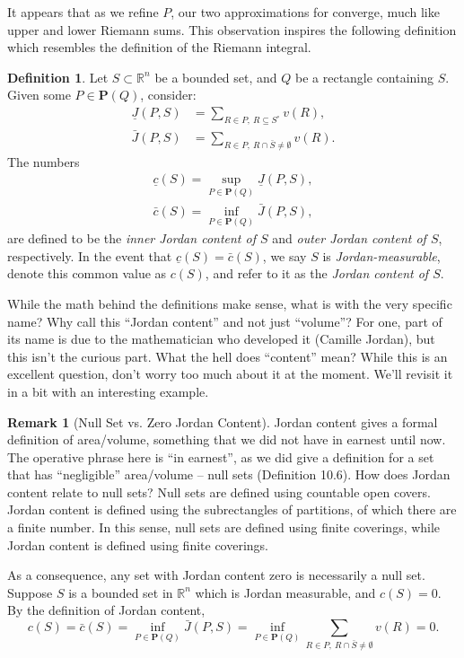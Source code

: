 \documentclass{article}
\newcommand{\R}{\mathbb{R}}
\theoremstyle{definition}
\newtheorem{definition}{Definition}[section]
\newtheorem{remark}{Remark}[section]
\begin{document}
	It appears that as we refine $ P $, our two approximations for converge, much like upper and lower Riemann sums. This observation inspires the following definition which resembles the definition of the Riemann integral.
	
	\begin{definition}\label{def10.7}
		Let $ S\subset \R^n $ be a bounded set, and $ Q $ be a rectangle containing $ S $. Given some $ P\in \mathbf P(Q) $, consider:
		\begin{align*}
			\underline J(P,S) &= \sum_{R\in P,\ R\subseteq S^\circ} v(R),\\
			\bar J(P,S) & = \sum_{R\in P,\ R\cap \bar S\neq \emptyset}v(R).
		\end{align*}
	The numbers 
	\begin{align*}
		\underline c(S) = \sup_{P\in \textbf{P}(Q)} \underline{J}(P,S),\\ 
		\bar c(S) = \inf_{P\in \textbf{P}(Q)} \bar {J}(P,S),
	\end{align*}
	are defined to be the  \textit{\color{red}inner Jordan content of $ S $} and \textit{\color{red}outer Jordan content of $ S $}, respectively. In the event that $  \underline c(S) = \bar c(S)$, we say $ S $ is \textit{\color{red}Jordan-measurable},  denote this common value as $ c(S) $, and refer to it as the \textit{\color{red}Jordan content of $ S $}.
	\end{definition}
	While the math behind the definitions make sense, what is with the very specific name? Why call this ``Jordan content'' and not just ``volume''? For one, part of its name is due to the mathematician who developed it (Camille Jordan), but this isn't the curious part. What the hell does ``content'' mean? While this is an excellent question, don't worry too much about it at the moment. We'll revisit it in a bit with an interesting example. 
	
	\begin{remark}[Null Set vs. Zero Jordan Content]
		Jordan content gives a formal definition of area/volume, something that we did not have in earnest until now. The operative phrase here is ``in earnest'', as we did give a definition for a set that has ``negligible'' area/volume -- null sets (Definition 10.6). How does Jordan content relate to null sets? Null sets are defined using countable open covers. Jordan content is defined using the subrectangles of partitions, of which there are a finite number. In this sense, null sets are defined using finite coverings, while Jordan content is defined using finite coverings. 
		
		As a consequence, any set with Jordan content zero is necessarily a null set.  Suppose $ S $ is a bounded set in $ \R^n $ which is Jordan measurable, and $ c(S) = 0 $. By the definition of Jordan content, 
		$$	c(S) = \bar c(S) = \inf_{P\in \textbf{P}(Q)}\bar J(P,S)  = \inf_{P\in \textbf{P}(Q)}\sum_{R\in P,\ R\cap \bar S\neq \emptyset}v(R)= 0.$$
	\end{remark}
	
\end{document}
